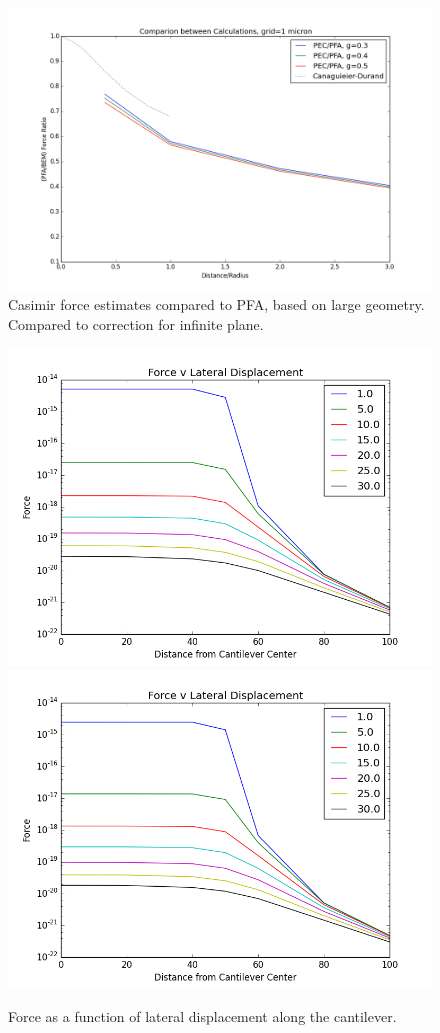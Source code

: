 \documentclass[11pt,traditabstract]{article}
\begin{document}
\begin{figure}[h]
\centering
\includegraphics[width=7in]{pfa_v_pec_best}
\caption{Casimir force estimates compared to PFA, based on large geometry. Compared to correction for infinite plane.}\label{fig:geometricbest}
\end{figure}

\begin{figure}[h]
\centering
\includegraphics[width=5in]{lateral_force}
\includegraphics[width=5in]{lateral_force_finite}
\caption{Force as a function of lateral displacement along the cantilever.}\label{fig:lat}
\end{figure}
\end{document}
